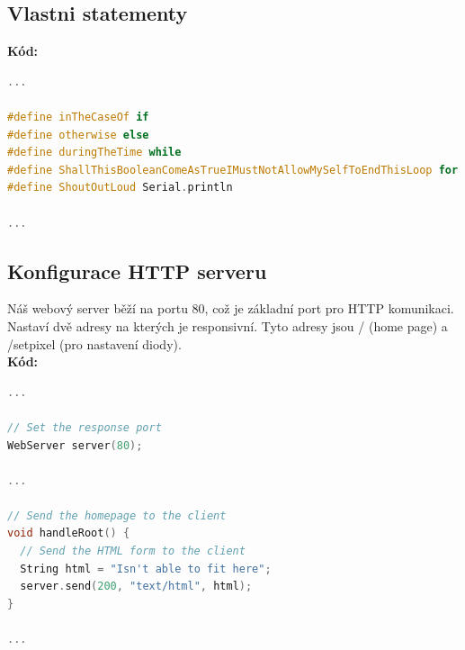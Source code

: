 \documentclass{article}
\begin{document}
\subsection{Vlastni statementy}
\textbf{Kód:}
\begin{lstlisting}[language=C++]
...

#define inTheCaseOf if
#define otherwise else
#define duringTheTime while
#define ShallThisBooleanComeAsTrueIMustNotAllowMySelfToEndThisLoop for
#define ShoutOutLoud Serial.println

...
\end{lstlisting}

\subsection{Konfigurace HTTP serveru}
Náš webový server běží na portu 80, což je základní port pro HTTP komunikaci. Nastaví dvě adresy na kterých je responsivní.
Tyto adresy jsou / (home page) a /setpixel (pro nastavení diody). \\
\textbf{Kód:}
\begin{lstlisting}[language=C++]
...

// Set the response port
WebServer server(80);

...

// Send the homepage to the client
void handleRoot() {
  // Send the HTML form to the client
  String html = "Isn't able to fit here";
  server.send(200, "text/html", html);
}

...
\end{lstlisting}
\end{document}
